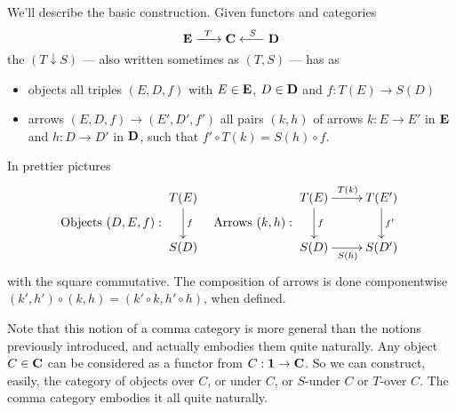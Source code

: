 We'll describe the basic construction. Given functors and
categories
\begin{equation}%
\ms{E}\xrightarrow{\;\;T\;\;}\ms{C}\xleftarrow{\;\;S\;\;}\ms{D}
\end{equation}
the  $(T\downarrow{}S)$ --- also written
sometimes as $(T,S)$ --- has as
\begin{itemize}
\item objects all triples $(E,D,f)$ with $E\in\mathbf{E}$, $D\in\mathbf{D}$ and $f:T(E)\to{}S(D)$
\item arrows $(E,D,f)\to(E',D',f')$ all pairs $(k,h)$ of arrows
  $k:E\to E'$ in $\mathbf{E}$ and $h:D\to D'$ in $\mathbf{D}$, such that $f'\circ{}T(k)=S(h)\circ{}f$.
\end{itemize}
In prettier pictures
\begin{equation}
\text{Objects }(D,E,f):\vcenter{\xymatrix{ T(E)\ar[d]^{f}\\ S(D)}}\quad
\text{Arrows }(k,h):\vcenter{\xymatrix{
T(E)\ar[d]^{f}\ar[r]^{T(k)}&T(E')\ar[d]^{f'}\\
S(D)\ar[r]_{S(h)}& S(D')
}}
\end{equation}
with the square commutative. The composition of arrows is done
componentwise $(k',h')\circ(k,h)=(k'\circ{}k,h'\circ{}h)$, when
defined.

Note that this notion of a comma category is more general than
the notions previously introduced, and actually embodies them
quite naturally. Any object $C\in\mathbf{C}$ can be considered as a
functor from $C:\mathbf{1}\to\mathbf{C}$. So we can construct, easily,
the category of objects over $C$, or under $C$, or $S$-under $C$
or $T$-over $C$. The comma category embodies it all quite
naturally.
